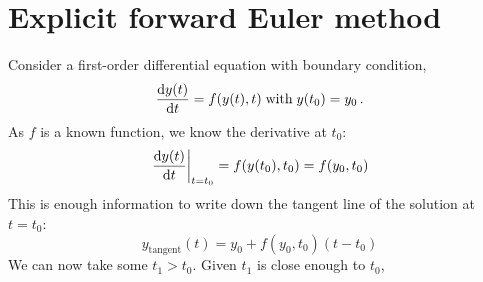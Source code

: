 \documentclass[../classnotes.tex]{subfiles}
\begin{document}
\chapter{Explicit forward Euler method}


Consider a first-order differential equation with boundary condition,
\begin{equation}
    \odv{y(t)}{t} = f(y(t), t)\; \text{with}\; y(t_0) = y_0\,.
\end{equation}
As \(f\) is a known function, we know the derivative at \(t_0\):
\begin{equation}
    \left.\odv{y(t)}{t} \right|_{t=t_0} = f(y(t_0), t_0) = f(y_0, t_0)
\end{equation}
This is enough information to write down the tangent line of the solution at \(t = t_0\):
\begin{equation}
    y_{\mathrm{tangent}}(t) = y_0 + f(y_0, t_0)(t - t_0)
\end{equation}
We can now take some \(t_1 > t_0\).
Given \(t_1\) is close enough to \(t_0\),
\end{document}
